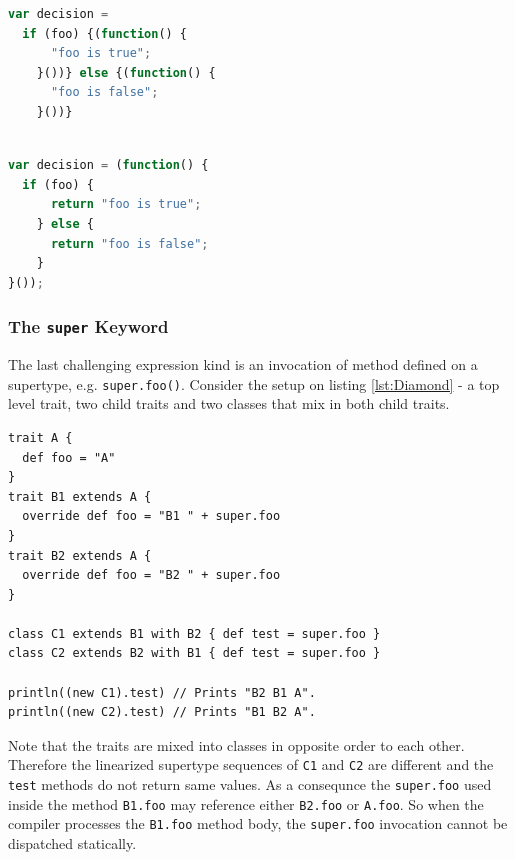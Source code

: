 \documentclass[12pt,a4paper]{report}
\begin{document}
\begin{center}
\begin{minipage}{.48\textwidth}
  \begin{lstlisting}[language=JavaScript,caption={The first step of condition compilation.},label={lst:IfReturnFirst},showlines=true]
var decision =
  if (foo) {(function() {
	  "foo is true";
	}())} else {(function() {
	  "foo is false";
	}())}
	
  \end{lstlisting}
\end{minipage}
\hfill
\begin{minipage}{.48\textwidth}
  \begin{lstlisting}[language=JavaScript,caption={The result of condition compilation.},label={lst:IfReturnFinal}]
var decision = (function() {
  if (foo) {
	  return "foo is true";
	} else {
	  return "foo is false";
	}
}());
  \end{lstlisting}
\end{minipage}
\end{center}

\subsubsection*{The \texttt{super} Keyword}

The last challenging expression kind is an invocation of method defined on a supertype, e.g. \texttt{super.foo()}. Consider the setup on listing \ref{lst:Diamond} - a top level trait, two child traits and two classes that mix in both child traits.

\begin{lstlisting}[caption={The \texttt{super} keyword non-static behavior example.},label={lst:Diamond}]
trait A { 
  def foo = "A" 
}
trait B1 extends A { 
  override def foo = "B1 " + super.foo
}
trait B2 extends A { 
  override def foo = "B2 " + super.foo
}

class C1 extends B1 with B2 { def test = super.foo }
class C2 extends B2 with B1 { def test = super.foo }

println((new C1).test) // Prints "B2 B1 A".
println((new C2).test) // Prints "B1 B2 A".
\end{lstlisting}

Note that the traits are mixed into classes in opposite order to each other. Therefore the linearized supertype sequences of \texttt{C1} and \texttt{C2} are different and the \texttt{test} methods do not return same values. As a consequnce the \texttt{super.foo} used inside the method \texttt{B1.foo} may reference either \texttt{B2.foo} or \texttt{A.foo}. So when the compiler processes the \texttt{B1.foo} method body, the \texttt{super.foo} invocation cannot be dispatched statically.
\end{document}

